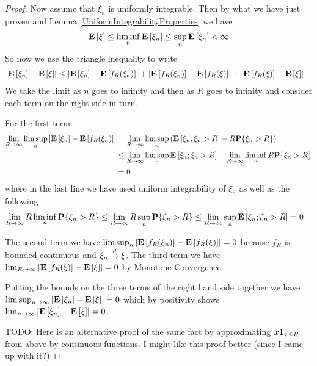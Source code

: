 \begin{proof}
Now assume that $\xi_n$ is uniformly integrable.  Then by what we have
just proven and Lemma \ref{UniformIntegrabilityProperties} we have
\begin{align*}
\textbf{E}\left[\xi\right] \leq \liminf_n \textbf{E}\left[\xi_n\right]  \leq \sup_n
\textbf{E}\left[\xi_n\right] < \infty
\end{align*}
So now we use the triangle inequality to write
\begin{align*}
\left \vert \textbf{E}\left[\xi_n\right] - \textbf{E}\left[\xi\right] \right \vert &\leq
\left \vert \textbf{E}\left[\xi_n\right] - \textbf{E}\left[f_R(\xi_n)\right] \right \vert +
\left \vert \textbf{E}\left[f_R(\xi_n)\right] - \textbf{E}\left[f_R(\xi)\right] \right \vert + \left \vert \textbf{E}\left[f_R(\xi)\right] - \textbf{E}\left[\xi\right] \right \vert
\end{align*}
We take the limit as $n$ goes to infinity and then as $R$ goes to
infinity and consider each term on the right side in turn.

For the first term:
\begin{align*}
\lim_{R \to \infty} \limsup_n \left \vert \textbf{E}\left[\xi_n\right] -
  \textbf{E}\left[f_R(\xi_n)\right] \right \vert 
&= \lim_{R \to \infty} \limsup_n \left ( 
\textbf{E}\left[\xi_n ; \xi_n > R\right] - R\textbf{P}\{\xi_n > R\} \right) \\
&\leq \lim_{R \to \infty} \limsup_n \textbf{E}\left[\xi_n ; \xi_n > R\right] -
\lim_{R \to \infty} \liminf_n R\textbf{P}\{\xi_n > R\}  \\
&= 0
\end{align*}
where in the last line we have used uniform integrability of $\xi_n$
as well as the following
\begin{align*}
\lim_{R \to \infty} R \liminf_n \textbf{P}\{\xi_n > R\} &\leq \lim_{R \to \infty} R \sup_n \textbf{P}\{\xi_n > R\}  \leq \lim_{R \to \infty} \sup_n \textbf{E}\left[\xi_n ; \xi_n > R\right] = 0
\end{align*}

The second term we have $\limsup_n \left \vert \textbf{E}\left[f_R(\xi_n)\right] -
  \textbf{E}\left[f_R(\xi)\right] \right \vert  = 0$ because $f_R$ is bounded continuous
and $\xi_n \overset{d}\to \xi$.  The third term we have $\lim_{R \to \infty}
\left \vert \textbf{E}\left[f_R(\xi)\right] - \textbf{E}\left[\xi\right] \right \vert = 0$ by Monotone
Convergence.

Putting the bounds on the three terms of the right hand side together
we have $\limsup_{n \to \infty} \left \vert \textbf{E}\left[\xi_n\right] -
  \textbf{E}\left[\xi\right] \right \vert = 0$ which by positivity shows $\lim_{n \to \infty} \left \vert \textbf{E}\left[\xi_n\right] -
  \textbf{E}\left[\xi\right] \right \vert = 0$.

TODO:  Here is an alternative proof of the same fact by approximating $x
\textbf{1}_{x \leq R}$ from above by continuous functions.  I
might like this proof better (since I came up with it?)


\end{proof}
